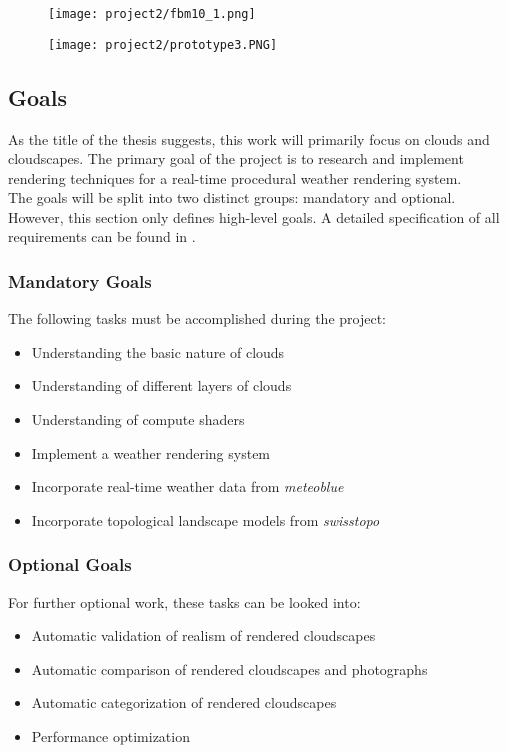 \begin{figure}[H]
    \centering
        \begin{minipage}{0.47\linewidth}
            \texttt{[image: project2/fbm10\_1.png]}
        \end{minipage}
    \hfill
        \begin{minipage}{0.47\linewidth}
            \texttt{[image: project2/prototype3.PNG]}
        \end{minipage}  
\end{figure}

\subsection{Goals}
\label{section:goals}
As the title of the thesis suggests, this work will primarily focus on clouds and cloudscapes.
The primary goal of the project is to research and implement rendering techniques for a real-time \gls{procedural} weather rendering system.
\\
The goals will be split into two distinct groups: mandatory and optional. However, this section only defines high-level goals. A detailed specification of all requirements can be found in .

\subsubsection{Mandatory Goals}
The following tasks must be accomplished during the project:
\begin{itemize}
    \item Understanding the basic nature of clouds
    \item Understanding of different layers of clouds
    \item Understanding of compute shaders
    \item Implement a weather rendering system
    \item Incorporate real-time weather data from \emph{meteoblue}
    \item Incorporate topological landscape models from \emph{swisstopo}
\end{itemize}

\subsubsection{Optional Goals}
For further optional work, these tasks can be looked into:
\begin{itemize}
    \item Automatic validation of realism of rendered cloudscapes
    \item Automatic comparison of rendered cloudscapes and photographs
    \item Automatic categorization of rendered cloudscapes
    \item Performance optimization
\end{itemize}

